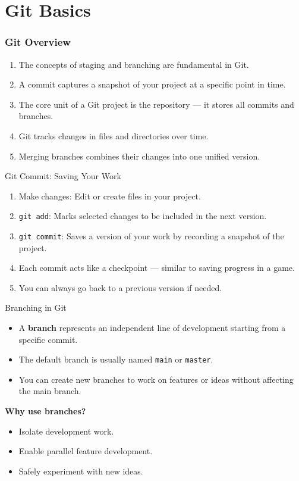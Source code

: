 \documentclass[12pt]{beamer}
\begin{document}
\section{Git Basics}

\begin{frame}
  \frametitle{Git Overview}
  \begin{enumerate}
    \setlength\itemsep{1em}
    \item The concepts of staging and branching are fundamental in Git.
    \item A commit captures a snapshot of your project at a specific point in time.
    \item The core unit of a Git project is the repository — it stores all commits and branches.
    \item Git tracks changes in files and directories over time.
    \item Merging branches combines their changes into one unified version.
  \end{enumerate}
\end{frame}

\begin{frame}{Git Commit: Saving Your Work}
  \begin{enumerate}
    \setlength\itemsep{1em}
    \item Make changes: Edit or create files in your project.
    \item \texttt{git add}: Marks selected changes to be included in the next version.
    \item \texttt{git commit}: Saves a version of your work by recording a snapshot of the project.
    \item Each commit acts like a checkpoint — similar to saving progress in a game.
    \item You can always go back to a previous version if needed.
  \end{enumerate}
\end{frame}

\begin{frame}{Branching in Git}
  \begin{itemize}
    \item A \textbf{branch} represents an independent line of development starting from a specific commit.
    \item The default branch is usually named \texttt{main} or \texttt{master}.
    \item You can create new branches to work on features or ideas without affecting the main branch.
  \end{itemize}

  \vspace{1em}
  \textbf{Why use branches?}
  \vspace{1em}
  
  \begin{itemize}
    \item Isolate development work.
    \item Enable parallel feature development.
    \item Safely experiment with new ideas.
  \end{itemize}
\end{frame}
\end{document}

